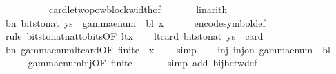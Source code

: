 \begin{isabellebody}
\ \ \ \ \ \ \ \ \ \ card{\isacharunderscore}{\kern0pt}le{\isacharunderscore}{\kern0pt}two{\isacharunderscore}{\kern0pt}pow{\isacharunderscore}{\kern0pt}block{\isacharunderscore}{\kern0pt}width{\isacharbrackleft}{\kern0pt}of\ {\isasymGamma}{\isacharbrackright}{\kern0pt}\isanewline
\ \ \ \ \isamarkupfalse%
\ linarith\isanewline
\ \ \isamarkupfalse%
\ bn{\isacharcolon}{\kern0pt}\ {\isachardoublequoteopen}bits{\isacharunderscore}{\kern0pt}to{\isacharunderscore}{\kern0pt}nat\ {\isacharquery}{\kern0pt}ys\ {\isacharequal}{\kern0pt}\ gamma{\isacharunderscore}{\kern0pt}enum\ {\isasymGamma}\ bl\ x{\isachardoublequoteclose}\isanewline
\ \ \ \ \isamarkupfalse%
\ encode{\isacharunderscore}{\kern0pt}symbol{\isacharunderscore}{\kern0pt}def\isanewline
\ \ \ \ \isamarkupfalse%
\ {\isacharparenleft}{\kern0pt}rule\ bits{\isacharunderscore}{\kern0pt}to{\isacharunderscore}{\kern0pt}nat{\isacharunderscore}{\kern0pt}nat{\isacharunderscore}{\kern0pt}to{\isacharunderscore}{\kern0pt}bits{\isacharbrackleft}{\kern0pt}OF\ lt{\isacharunderscore}{\kern0pt}x{\isacharbrackright}{\kern0pt}{\isacharparenright}{\kern0pt}\isanewline
\ \ \isamarkupfalse%
\ lt{\isacharunderscore}{\kern0pt}card{\isacharcolon}{\kern0pt}\ {\isachardoublequoteopen}bits{\isacharunderscore}{\kern0pt}to{\isacharunderscore}{\kern0pt}nat\ {\isacharquery}{\kern0pt}ys\ {\isacharless}{\kern0pt}\ card\ {\isasymGamma}{\isachardoublequoteclose}\isanewline
\ \ \ \ \isamarkupfalse%
\ bn\ gamma{\isacharunderscore}{\kern0pt}enum{\isacharunderscore}{\kern0pt}lt{\isacharunderscore}{\kern0pt}card{\isacharbrackleft}{\kern0pt}OF\ {\isacartoucheopen}finite\ {\isasymGamma}{\isacartoucheclose}\ {\isacartoucheopen}x\ {\isasymin}\ {\isasymGamma}{\isacartoucheclose}{\isacharbrackright}{\kern0pt}\ \isamarkupfalse%
\ simp\isanewline
\ \ \isamarkupfalse%
\ inj{\isacharcolon}{\kern0pt}\ {\isachardoublequoteopen}inj{\isacharunderscore}{\kern0pt}on\ {\isacharparenleft}{\kern0pt}gamma{\isacharunderscore}{\kern0pt}enum\ {\isasymGamma}\ bl{\isacharparenright}{\kern0pt}\ {\isasymGamma}{\isachardoublequoteclose}\isanewline
\ \ \ \ \isamarkupfalse%
\ gamma{\isacharunderscore}{\kern0pt}enum{\isacharunderscore}{\kern0pt}bij{\isacharbrackleft}{\kern0pt}OF\ {\isacartoucheopen}finite\ {\isasymGamma}{\isacartoucheclose}{\isacharbrackright}{\kern0pt}\isanewline
\ \ \ \ \isamarkupfalse%
\ {\isacharparenleft}{\kern0pt}simp\ add{\isacharcolon}{\kern0pt}\ bij{\isacharunderscore}{\kern0pt}betw{\isacharunderscore}{\kern0pt}def{\isacharparenright}{\kern0pt}\isanewline

\end{isabellebody}
